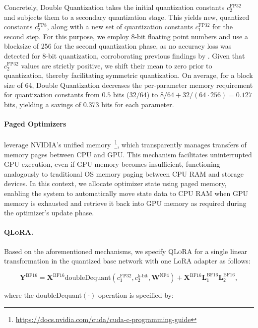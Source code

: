 Concretely, Double Quantization takes the initial quantization constants $c_2^{\text{FP32}}$ and subjects them to a secondary quantization stage. This yields new, quantized constants $c_2^{\text{FP8}}$, along with a new set of quantization constants $c_1^{\text{FP32}}$ for the second step. For this purpose, we employ 8-bit floating point numbers and use a blocksize of 256 for the second quantization phase, as no accuracy loss was detected for 8-bit quantization, corroborating previous findings by \citet{dettmers2022case}. 
Given that $c_2^{\text{FP32}}$ values are strictly positive, we shift their mean to zero prior to quantization, thereby facilitating symmetric quantization. On average, for a block size of 64, Double Quantization decreases the per-parameter memory requirement for quantization constants from $0.5$ bits ($32/64$) to $8/64 + 32/(64 \cdot 256) = 0.127$ bits, yielding a savings of 0.373 bits for each parameter.

\paragraph{Paged Optimizers} leverage NVIDIA's unified memory~\footnote{\tiny \url{https://docs.nvidia.com/cuda/cuda-c-programming-guide}}, which transparently manages transfers of memory pages between CPU and GPU. This mechanism facilitates uninterrupted GPU execution, even if GPU memory becomes insufficient, functioning analogously to traditional OS memory paging between CPU RAM and storage devices. In this context, we allocate optimizer state using paged memory, enabling the system to automatically move state data to CPU RAM when GPU memory is exhausted and retrieve it back into GPU memory as required during the optimizer’s update phase.

\paragraph{\textsc{QLoRA}.} Based on the aforementioned mechanisms, we specify \textsc{QLoRA} for a single linear transformation in the quantized base network with one LoRA adapter as follows:

\begin{equation}
    \mathbf{Y}^{\text{BF16}} =  \mathbf{X}^{\text{BF16}} \text{doubleDequant}(c_1^{\text{FP32}}, c_2^{\text{k-bit}}, \mathbf{W}^{\text{NF4}}) + \mathbf{X}^{\text{BF16}}\mathbf{L}^{\text{BF16}}_1\mathbf{L}^{\text{BF16}}_2,
\end{equation}

where the doubleDequant$(\cdot)$ operation is specified by:

